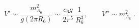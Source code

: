 \begin{equation}
V' \sim \frac{m_{A_6}^2}{g(2\pi R_6)} \sim \frac{c_6 g}{2\pi^5}\,
\frac{1}{R_6^3}, \quad \quad  V'' \sim m_{A_6}^2 \;.
\end{equation} 

